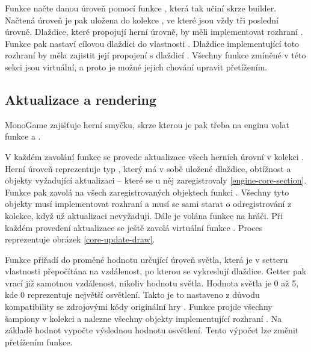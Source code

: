 Funkce  načte danou úroveň pomocí funkce , která tak učiní skrze builder.
Načtená úroveň je pak uložena do kolekce , ve které jsou vždy tři poslední úrovně.
Dlaždice, které propojují herní úrovně, by měli implementovat rozhraní .
Funkce  pak nastaví cílovou dlaždici do vlastnosti .
Dlaždice implementující toto rozhraní by měla zajistit její propojení s dlaždicí .
Všechny funkce zmíněné v této sekci jsou virtuální, a proto je možné jejich chování upravit přetížením.


\subsection{Aktualizace a rendering}
MonoGame zajišťuje herní smyčku, skrze kterou je pak třeba na enginu volat funkce  a .

V každém zavolání funkce  se provede aktualizace všech herních úrovní v kolekci .
Herní úroveň reprezentuje typ , který má v sobě uložené dlaždice, obtížnost a objekty vyžadující
aktualizaci -- které se u něj zaregistrovaly \vref{engine-core-section}. Funkce  pak 
zavolá na všech zaregistrovaných objektech  funkci . Všechny tyto objekty musí implementovat
rozhraní  a musí se sami starat o odregistrování z kolekce, když už aktualizaci nevyžadují. Dále je volána 
funkce  na hráči. Při každém provedení aktualizace se ještě zavolá virtuální funkce 
. Proces reprezentuje obrázek \ref{core-update-draw}.

Funkce  přiřadí do proměné  hodnotu určující úroveň světla, která je v setteru
vlastnosti přepočítána na vzdálenost, po kterou se vykreslují dlaždice. Getter pak vrací již samotnou vzdálenost,
nikoliv hodnotu světla. Hodnota světla je 0 až 5, kde 0 reprezentuje největší osvětlení. Takto je to nastaveno
z důvodu kompatibility se zdrojovými kódy originální hry \cite{DMDecompilation}. 
 Funkce projde všechny šampiony v kolekci  a nalezne všechny 
objekty implementující rozhraní . Na základě hodnot  vypočte 
výslednou hodnotu osvětlení. Tento výpočet lze změnit přetížením funkce. 

